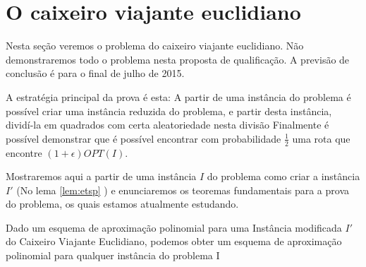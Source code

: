 \section{O caixeiro viajante euclidiano}

Nesta seção veremos o problema do caixeiro viajante euclidiano. Não demonstraremos todo o problema nesta proposta de qualificação. A previsão de conclusão é para o final de julho de 2015.

A estratégia principal da prova é esta: A partir de uma instância do problema é possível criar uma instância reduzida do problema, e partir desta instância, dividí-la em quadrados com certa aleatoriedade nesta divisão Finalmente é possível demonstrar \cite{Williamson} que é possível encontrar com probabilidade $\frac{1}{2}$ uma rota que encontre $(1 + \epsilon) OPT(I)$.

Mostraremos aqui a partir de uma instância $I$ do problema como criar a instância $I'$ (No lema \ref{lem:etsp} ) e enunciaremos os teoremas fundamentais para a prova do problema, os quais estamos atualmente estudando.

\begin{lema}
\label{lem:etsp}
Dado um esquema de aproximação polinomial para uma Instância modificada $I'$ do Caixeiro Viajante Euclidiano, podemos obter um esquema de aproximação polinomial para qualquer instância do problema I
\end{lema}

